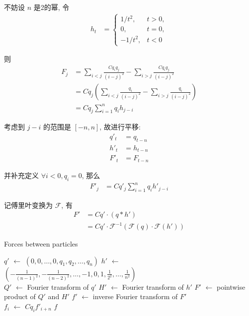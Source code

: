\documentclass{ctexart}
\newcommand{\Let}[1]{\State #1 $\gets$}
\newcommand{\Ret}[1]{\State \textbf{return} #1}
\begin{document}
不妨设 $n$ 是2的幂, 令
\begin{align*}
    h_t & = \begin{cases}
                1/t^2,  & t>0, \\
                0,      & t=0, \\
                -1/t^2, & t<0
            \end{cases}
\end{align*}

则
\begin{align*}
    F_j & = \sum_{i<j} \frac{Cq_iq_j}{(i-j)^2} - \sum_{i>j} \frac{Cq_iq_j}{(i-j)^2}          \\
        & = Cq_j\left(\sum_{i<j} \frac{q_i}{(i-j)^2} - \sum_{i>j} \frac{q_i}{(i-j)^2}\right) \\
        & = Cq_j\sum_{i=1}^n q_i h_{j-i}
\end{align*}

考虑到 $j-i$ 的范围是 $[-n, n]$, 故进行平移:
\begin{align*}
    q'_t & = q_{t-n} \\
    h'_t & = h_{t-n} \\
    F'_t & = F_{t-n}
\end{align*}

并补充定义 $\forall i<0, q_i = 0$, 那么
\begin{align*}
    F'_j & = Cq'_j \sum_{i=1}^n q_i h'_{j-i}
\end{align*}

记傅里叶变换为 $\mathcal{F}$, 有
\begin{align*}
    F' & = C q' \cdot (q \ast h')                                                       \\
       & = C q' \cdot \mathcal{F}^{-1}\left(\mathcal{F}(q) \cdot \mathcal{F}(h')\right)
\end{align*}

\begin{algorithm}[H]
    \caption{Forces between particles}
    \begin{algorithmic}
        \Let{$q'$} $(0, 0, \ldots, 0, q_1, q_2, \ldots, q_n)$
        \Let{$h'$} $\displaystyle \left(-\frac{1}{(n-1)^2}, -\frac{1}{(n-2)^2}, \ldots, -1, 0, 1, \frac{1}{2^2}, \ldots, \frac{1}{n^2}\right)$
        \\
        \Let{$Q'$} Fourier transform of $q'$
        \Let{$H'$} Fourier transform of $h'$
        \Let{$F'$} pointwise product of $Q'$ and $H'$
        \Let{$f'$} inverse Fourier transform of $F'$
        \\
            \Let{$f_i$} $C q_i f'_{i+n}$
        \EndFor
        \Ret $f$
        \EndFunction
    \end{algorithmic}
\end{algorithm}
\end{document}
